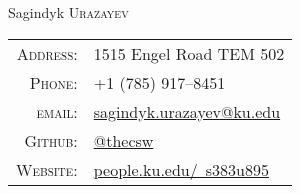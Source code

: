\documentclass[a4paper,10pt]{article}
\begin{document}
\pagestyle{empty} %

\par{\centering
		{\Huge Sagindyk \textsc{Urazayev}
	}\bigskip\par}

      \begin{center}
        \begin{tabular}{rl}
          \textsc{Address:}   & 1515 Engel Road TEM 502 \\
          \textsc{Phone:}     & +1 (785) 917--8451\\
          \textsc{email:}     & \href{mailto:sagindyk.urazayev@ku.edu}{sagindyk.urazayev@ku.edu}\\
          \textsc{Github:} & \href{https://github.com/thecsw}{@thecsw}\\
          \textsc{Website:} & \href{http://people.ku.edu/~s383u895}{people.ku.edu/~s383u895}\\
        \end{tabular}
      \end{center}

\end{document}
